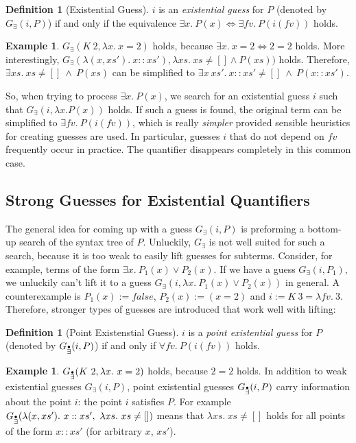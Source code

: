 \documentclass[a4paper,12pt,DIV=12,oneside]{scrbook}
\newcommand{\fv}{\textit{fv}}
\theoremstyle{definition}
\newtheorem{definition}[lemma]{Definition}
\newtheorem{example}[lemma]{Example}
\theoremstyle{remark}
\newcommand{\GE}{\ensuremath{G_\exists}}
\newcommand{\GEP}{\ensuremath{G_{\accentset{\bullet}{\exists}}}}
\begin{document}
\begin{definition}[Existential Guess]
  $i$ is an \emph{existential guess} for $P$ (denoted by $\GE(i, P)$)
  if and only if the equivalence $\exists x.\ P(x) \Longleftrightarrow
  \exists \fv.\ P(i(\fv))$ holds.
\end{definition}

\begin{example}
$\GE(K\ 2, \lambda x.\ x = 2)$ holds, because $\exists x.\ x = 2
\Longleftrightarrow 2 = 2$ holds. More interestingly,
$\GE(\lambda(x, xs').\ x::xs'), \lambda xs.\ xs \neq [] \wedge P(xs))$
holds. Therefore, $\exists xs.\ xs \neq []\ \wedge\ P(xs)$ can be simplified
to $\exists x\ xs'.\ x::xs' \neq []\ \wedge\ P(x::xs')$.
\end{example}

So, when trying to process $\exists x.\ P(x)$, we search
for an existential guess $i$ such that $\GE(i, \lambda x. P(x))$
holds. If such a guess is found, the original term can be simplified to
$\exists \fv.\ P(i(\fv))$, which is really \emph{simpler} provided sensible heuristics for creating
guesses are used. In particular, guesses $i$ that do not depend on $\fv$ frequently occur in practice.
The quantifier disappears completely in this common case.

\subsection{Strong Guesses for Existential Quantifiers}

The general idea for coming up with a guess $\GE(i, P)$ is preforming
a bottom-up search of the syntax tree of $P$. Unluckily, $\GE$ is
not well suited for such a search, because it is too weak to easily lift
guesses for subterms. Consider, for example, terms of the form
$\exists x.\ P_1(x) \vee P_2(x)$. If we have a guess $\GE(i, P_1)$, we unluckily can't lift it
to a guess $\GE(i, \lambda x.\ P_1(x) \vee P_2(x))$ in general. A counterexample
is $P_1(x) := \textit{false}$, $P_2(x) := (x = 2)$ and $i := K\ 3 = \lambda \fv.\ 3$.
Therefore, stronger types of guesses are introduced that work well with lifting:

\begin{definition}[Point Existenstial Guess]
$i$ is a \emph{point existential guess} for $P$ (denoted by $\GEP(i, P)$) if and only if $\forall \fv.\ P(i(\fv))$ holds.
\end{definition}

\begin{example}
  $\GEP(K\ 2, \lambda x.\ x=2)$ holds, because $2=2$ holds. In
  addition to weak existential guesses $\GE(i,P)$, point existential
  guesses $\GEP(i,P)$ carry information about the point $i$: the point
  $i$ satisfies $P$. For example $\GEP(\lambda (x,xs').\ x::xs',\ \lambda
  xs.\ xs \neq [])$ means that $\lambda xs.\ xs \neq []$ holds for all
  points of the form $x :: xs'$ (for arbitrary $x$, $xs'$).
\end{example}
\end{document}
